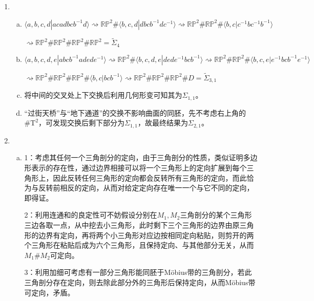 \documentclass[a4paper,UTF8,fontset=windows]{ctexart}
\begin{document}
\subsection{}
\begin{enumerate}[(1)]
    \item
    \begin{enumerate}[(a)]
    \item
    $\langle a,b,c,d|acadbcb^{-1}d\rangle\rightsquigarrow\mathbb{RP}^2\#\langle b,c,d|dbcb^{-1}dc^{-1}\rangle\rightsquigarrow\mathbb{RP}^2\#\mathbb{RP}^2\#\langle b,c|c^{-1}bc^{-1}b^{-1}\rangle$
    
    $\rightsquigarrow\mathbb{RP}^2\#\mathbb{RP}^2\#\mathbb{RP}^2\#\mathbb{RP}^2=\widetilde{\Sigma}_4$
    
    \item
    $\langle a,b,c,d,e|abcb^{−1}adede^{−1}\rangle\rightsquigarrow\mathbb{RP}^2\#\langle b,c,d,e|dede^{-1}bcb^{-1}\rangle\rightsquigarrow\mathbb{RP}^2\#\mathbb{RP}^2\#\langle b,c,e|e^{-1}bcb^{-1}e^{-1}\rangle$
    
    $\rightsquigarrow\mathbb{RP}^2\#\mathbb{RP}^2\#\mathbb{RP}^2\#\langle b,c|bcb^{-1}\rangle\rightsquigarrow\mathbb{RP}^2\#\mathbb{RP}^2\#\mathbb{RP}^2\#D=\widetilde{\Sigma}_{3,1}$
    
    \item
    将中间的交叉处上下交换后利用几何形变可知其为$\Sigma_{1,1}$。
    
    \item
    “过街天桥”与“地下通道”的交换不影响曲面的同胚，先不考虑右上角的$\#\mathrm{T}^2$，可发现交换后剩下部分为$\Sigma_{1,1}$，故最终结果为$\Sigma_{2,1}$。
    \end{enumerate}
    
    \item
    \begin{enumerate}[(a)]
    \item
    1：考虑其任何一个三角剖分的定向，由于三角剖分的性质，类似证明多边形表示的存在性，通过边界相接可以将一个三角形上的定向扩展到每个三角形上，因此反转任何三角形的定向都会反转所有三角形的定向，而此恰为与反转前相反的定向，从而对给定定向存在唯一一个与它不同的定向，即得证。
    
    2：利用连通和的良定性可不妨假设分别在$M_1,M_2$三角剖分的某个三角形三边各取一点，从中挖去小三角形，此时剩下三个三角形的边界由原三角形的边界有定向，再将两个小三角形对应边按相同定向粘贴，则剪开的两个三角形在粘贴后成为六个三角形，且保持定向、与其他部分无关，从而$M_1\#M_2$可定向。
    
    3：利用加细可考虑有一部分三角形能同胚于M\"obius带的三角剖分，若此三角剖分存在定向，则去除此部分外的三角形后保持定向，从而M\"obius带可定向，矛盾。
    

\end{enumerate}
\end{enumerate}
\end{document}
